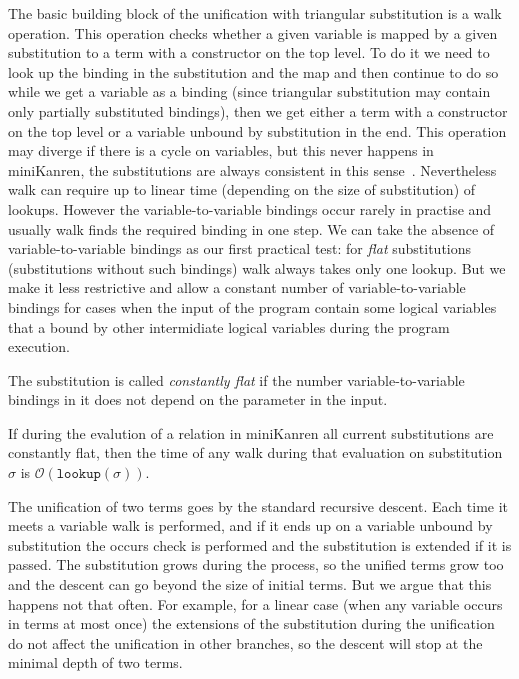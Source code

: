 \documentclass[acmsmall, anonymous, review]{acmart}
\newcommand{\mK}{miniKanren\xspace}
\newcommand{\lookuptime}[1]{\texttt{lookup}(#1)}
\renewcommand{\O}{\mathcal{O}}
\begin{document}
The basic building block of the unification with triangular substitution is a walk operation. This operation checks whether a given variable is mapped by a given substitution to a term with a constructor on the top level. To do it we need to look up the binding in the substitution and the map and then continue to do so while we get a variable as a binding (since triangular substitution may contain only partially substituted bindings), then we get either a term with a constructor on the top level or a variable unbound by substitution in the end. This operation may diverge if there is a cycle on variables, but this never happens in miniKanren, the substitutions are always consistent in this sense~\cite{NominalUnificationWithTriangularSubstitutions}. Nevertheless walk can require up to linear time (depending on the size of substitution) of lookups. However the variable-to-variable bindings occur rarely in practise and usually walk finds the required binding in one step. We can take the absence of variable-to-variable bindings as our first practical test: for \emph{flat} substitutions (substitutions without such bindings) walk always takes only one lookup. But we make it less restrictive and allow a constant number of variable-to-variable bindings for cases when the input of the program contain some logical variables that a bound by other intermidiate logical variables during the program execution.

\begin{definition}
The substitution is called \emph{constantly flat} if the number variable-to-variable bindings in it does not depend on the parameter in the input.
\end{definition}


\begin{lemma}
If during the evalution of a relation in \mK all current substitutions are constantly flat, then the time of any walk during that evaluation on substitution $\sigma$ is $\O(\lookuptime{\sigma})$.
\end{lemma}

The unification of two terms goes by the standard recursive descent. Each time it meets a variable walk is performed, and if it ends up on a variable unbound by substitution the occurs check is performed and the substitution is extended if it is passed. The substitution grows during the process, so the unified terms grow too and the descent can go beyond the size of initial terms. But we argue that this happens not that often. For example, for a linear case (when any variable occurs in terms at most once) the extensions of the substitution during the unification do not affect the unification in other branches, so the descent will stop at the minimal depth of two terms. 
\end{document}
